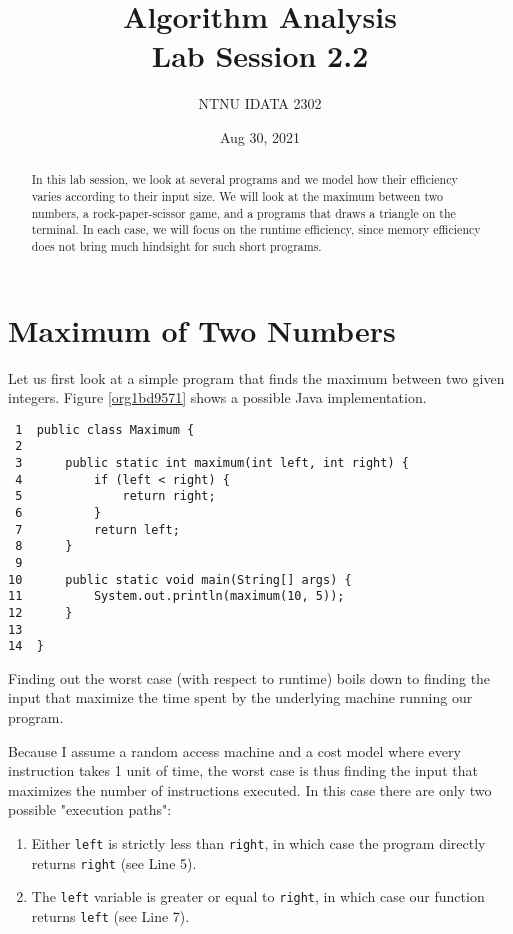 \documentclass[11pt]{article}
\author{NTNU IDATA 2302}
\date{Aug 30, 2021}
\title{Algorithm Analysis\\\medskip
\large Lab Session 2.2}
\begin{document}
\maketitle
\tableofcontents

\begin{abstract}
In this lab session, we look at several programs and we model how
their efficiency varies according to their input size. We will look at
the maximum between two numbers, a rock-paper-scissor game, and a
programs that draws a triangle on the terminal. In each case, we will
focus on the runtime efficiency, since memory efficiency does not
bring much hindsight for such short programs.
\end{abstract}


\section{Maximum of Two Numbers}
\label{sec:orgb501f4c}

Let us first look at a simple program that finds the maximum between
two given integers. Figure \ref{org1bd9571} shows a possible Java
implementation.

\begin{verbatim}
 1  public class Maximum {
 2  
 3      public static int maximum(int left, int right) {
 4          if (left < right) {
 5              return right;
 6          }
 7          return left;
 8      }
 9  
10      public static void main(String[] args) {  
11          System.out.println(maximum(10, 5));
12      }
13  
14  }
\end{verbatim}

Finding out the worst case (with respect to runtime) boils down to
finding the input that maximize the time spent by the underlying
machine running our program.

Because I assume a random access machine and a cost model where every
instruction takes 1 unit of time, the worst case is thus finding the
input that maximizes the number of instructions executed. In this case
there are only two possible "execution paths":

\begin{enumerate}
\item Either \texttt{left} is strictly less than \texttt{right}, in which case the program
directly returns \texttt{right} (see Line 5).

\item The \texttt{left} variable is greater or equal to \texttt{right}, in which case
our function returns \texttt{left} (see Line 7).
\end{enumerate}
\end{document}
